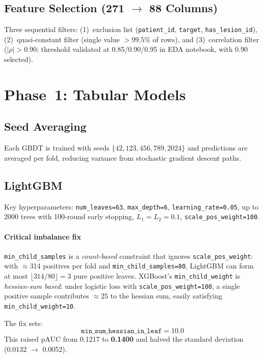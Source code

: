 \documentclass[conference]{IEEEtran}
\begin{document}
\subsection{Feature Selection (271 $\to$ 88 Columns)}

Three sequential filters:
(1)~exclusion list (\texttt{patient\_id}, \texttt{target}, \texttt{has\_lesion\_id}),
(2)~quasi-constant filter (single value $> 99.5\%$ of rows), and
(3)~correlation filter ($|\rho| > 0.90$; threshold validated at
0.85/0.90/0.95 in EDA notebook, with 0.90 selected).

\section{Phase~1: Tabular Models}

\subsection{Seed Averaging}

Each GBDT is trained with seeds $\{42, 123, 456, 789, 2024\}$ and
predictions are averaged per fold, reducing variance from stochastic
gradient descent paths.

\subsection{LightGBM~\cite{ke2017lightgbm}}

Key hyperparameters: \texttt{num\_leaves=63}, \texttt{max\_depth=6},
\texttt{learning\_rate=0.05}, up to 2000 trees with 100-round early
stopping, $L_1 = L_2 = 0.1$, \texttt{scale\_pos\_weight=100}.

\paragraph{Critical imbalance fix}
\texttt{min\_child\_samples} is a \emph{count-based} constraint that
ignores \texttt{scale\_pos\_weight}: with $\approx$314 positives per
fold and \texttt{min\_child\_samples=80}, LightGBM can form at most
$\lfloor 314/80 \rfloor = 3$ pure positive leaves.
XGBoost's \texttt{min\_child\_weight} is \emph{hessian-sum based}:
under logistic loss with \texttt{scale\_pos\_weight=100}, a single
positive sample contributes $\approx 25$ to the hessian sum, easily
satisfying \texttt{min\_child\_weight=10}.

The fix sets:
\begin{equation}
  \texttt{min\_sum\_hessian\_in\_leaf} = 10.0
  \label{eq:mchw}
\end{equation}
This raised pAUC from 0.1217 to \textbf{0.1400} and halved the
standard deviation (0.0132 $\to$ 0.0052).
\end{document}
